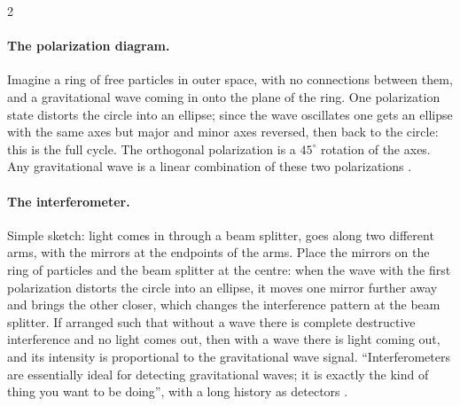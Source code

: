 \begin{paracol}{2}
\paragraph{The polarization diagram.} Imagine a ring of free particles in outer space, with no connections between them, and a gravitational wave coming in onto the plane of the ring. One polarization state distorts the circle into an ellipse; since the wave oscillates one gets an ellipse with the same axes but major and minor axes reversed, then back to the circle: this is the full cycle. The orthogonal polarization is a $45^\circ$ rotation of the axes. Any gravitational wave is a linear combination of these two polarizations .

\paragraph{The interferometer.} Simple sketch: light comes in through a beam splitter, goes along two different arms, with the mirrors at the endpoints of the arms. Place the mirrors on the ring of particles and the beam splitter at the centre: when the wave with the first polarization distorts the circle into an ellipse, it moves one mirror further away and brings the other closer, which changes the interference pattern at the beam splitter. If arranged such that without a wave there is complete destructive interference and no light comes out, then with a wave there is light coming out, and its intensity is proportional to the gravitational wave signal. ``Interferometers are essentially ideal for detecting gravitational waves; it is exactly the kind of thing you want to be doing'', with a long history as detectors .


\end{paracol}

